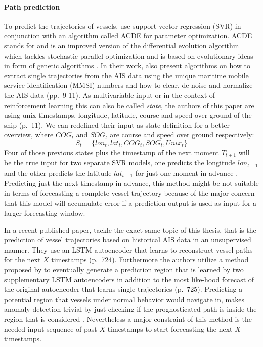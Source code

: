 \paragraph{Path prediction}
To predict the trajectories of vessels, \cite{liu2019vessel} use support vector regression (SVR) in conjunction with an algorithm called ACDE for  parameter optimization. ACDE stands for  and is an improved version of the differential evolution algorithm which tackles stochastic parallel optimization and is based on evolutionary ideas in form of genetic algorithms \cite[pp.~1-3]{thangaraj2009simple}. In their work, \cite{liu2019vessel} also present algorithms on how to extract single trajectories from the AIS data using the unique maritime mobile service identification (MMSI) numbers and how to clear, de-noise and normalize the AIS data (pp.~9-11). As multivariable input or in the context of reinforcement learning this can also be called \textit{state}, the authors of this paper are using unix timestamps, longitude, latitude, course and speed over ground of the ship (p.~11). We can redefined their input as state definition for a better overview, where $COG_t$ and $SOG_t$ are course and speed over ground respectively:
\begin{equation}
S_t = \{lon_t, lat_t, COG_t, SOG_t, Unix_t\}
\end{equation}
Four of those previous states plus the timestamp of the next moment $T_{t+1}$ will be the true input for two separate SVR models, one predicts the longitude $lon_{t+1}$ and the other predicts the latitude $lat_{t+1}$ for just one moment in advance \cite[p.~11]{liu2019vessel}. Predicting just the next timestamp in advance, this method might be not suitable in terms of forecasting a complete vessel trajectory because of the major concern that this model will accumulate error if a prediction output is used as input for a larger forecasting window.
\par
In a recent published paper, \cite{venskus2021unsupervised} tackle the exact same topic of this thesis, that is the prediction of vessel trajectories based on historical AIS data in an unsupervised manner. They use an LSTM autoencoder that learns to reconstruct vessel paths for the next $X$ timestamps (p.~724). Furthermore the authors utilize a method proposed by \cite{cruz2019} to eventually generate a prediction region that is learned by two supplementary LSTM autoencoders in addition to the  most like-hood forecast of the original autoencoder that learns single trajectories (p.~725). Predicting a potential region that vessels under normal behavior would navigate in, makes anomaly detection trivial by just checking if the prognosticated path is inside the region that is considered . Nevertheless a major constraint of this method is the needed input sequence of past $X$ timestamps to start forecasting the next $X$ timestamps.
